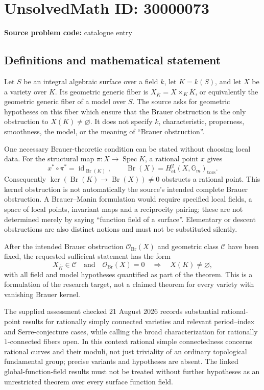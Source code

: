 \documentclass[11pt]{article}
\begin{document}
\section*{UnsolvedMath ID: 30000073}
\textbf{Source problem code:} catalogue entry
\subsection{Definitions and mathematical statement}
Let $S$ be an integral algebraic surface over a field $k$, let $K=k(S)$, and let $X$ be a variety over $K$. Its geometric generic fiber is $X_{\overline K}=X\times_K\overline K$, or equivalently the geometric generic fiber of a model over $S$. The source asks for geometric hypotheses on this fiber which ensure that the Brauer obstruction is the only obstruction to $X(K)\ne\varnothing$. It does not specify $k$, characteristic, properness, smoothness, the model, or the meaning of ``Brauer obstruction''.

One necessary Brauer-theoretic condition can be stated without choosing local data. For the structural map $\pi:X\to\operatorname{Spec}K$, a rational point $x$ gives
\[
 x^*\circ\pi^*=\operatorname{id}_{\operatorname{Br}(K)},\qquad
 \operatorname{Br}(X)=H^2_{\mathrm{\acute et}}(X,\mathbb G_m)_{\mathrm{tors}}.
\]
Consequently $\ker(\operatorname{Br}(K)\to\operatorname{Br}(X))\ne0$ obstructs a rational point. This kernel obstruction is not automatically the source's intended complete Brauer obstruction. A Brauer--Manin formulation would require specified local fields, a space of local points, invariant maps and a reciprocity pairing; these are not determined merely by saying ``function field of a surface''. Elementary or descent obstructions are also distinct notions and must not be substituted silently.

After the intended Brauer obstruction $\mathcal O_{\mathrm{Br}}(X)$ and geometric class $\mathcal C$ have been fixed, the requested sufficient statement has the form
\[
 X_{\overline K}\in\mathcal C\quad\text{and}\quad
 \mathcal O_{\mathrm{Br}}(X)=0
 \quad\Longrightarrow\quad X(K)\ne\varnothing,
\]
with all field and model hypotheses quantified as part of the theorem. This is a formulation of the research target, not a claimed theorem for every variety with vanishing Brauer kernel.

The supplied assessment checked 21 August 2026 records substantial rational-point results for rationally simply connected varieties and relevant period--index and Serre-conjecture cases, while calling the broad characterization for rationally $1$-connected fibers open. In this context rational simple connectedness concerns rational curves and their moduli, not just triviality of an ordinary topological fundamental group; precise variants and hypotheses are absent. The linked global-function-field results must not be treated without further hypotheses as an unrestricted theorem over every surface function field.
\end{document}
